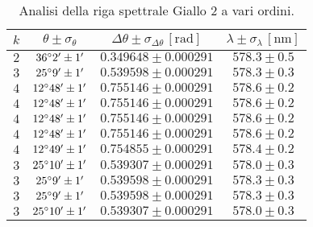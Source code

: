 \documentclass[]{article}
\begin{document}
    \begin{table}
        \centering
        \begin{tabular}{||c|c|c|c||}
            \hline
            $k$ & $\theta \pm \sigma_{\theta}$ & $\Delta\theta \pm \sigma_{\Delta\theta} \, \left[\text{rad}\right]$ & $\lambda \pm \sigma_{\lambda} \, \left[\text{nm}\right]$ \\\hline
            \hline
            $2$ & $36\degree  2' \pm 1'$ & $0.349648 \pm 0.000291$ & $578.3 \pm 0.5$ \\\hline
            $3$ & $25\degree  9' \pm 1'$ & $0.539598 \pm 0.000291$ & $578.3 \pm 0.3$ \\\hline
            $4$ & $12\degree 48' \pm 1'$ & $0.755146 \pm 0.000291$ & $578.6 \pm 0.2$ \\\hline
            $4$ & $12\degree 48' \pm 1'$ & $0.755146 \pm 0.000291$ & $578.6 \pm 0.2$ \\\hline
            $4$ & $12\degree 48' \pm 1'$ & $0.755146 \pm 0.000291$ & $578.6 \pm 0.2$ \\\hline
            $4$ & $12\degree 48' \pm 1'$ & $0.755146 \pm 0.000291$ & $578.6 \pm 0.2$ \\\hline
            $4$ & $12\degree 49' \pm 1'$ & $0.754855 \pm 0.000291$ & $578.4 \pm 0.2$ \\\hline
            $3$ & $25\degree 10' \pm 1'$ & $0.539307 \pm 0.000291$ & $578.0 \pm 0.3$ \\\hline
            $3$ & $25\degree  9' \pm 1'$ & $0.539598 \pm 0.000291$ & $578.3 \pm 0.3$ \\\hline
            $3$ & $25\degree  9' \pm 1'$ & $0.539598 \pm 0.000291$ & $578.3 \pm 0.3$ \\\hline
            $3$ & $25\degree 10' \pm 1'$ & $0.539307 \pm 0.000291$ & $578.0 \pm 0.3$ \\\hline
        \end{tabular}
        \label{giallo-2}
        \caption{Analisi della riga spettrale Giallo 2 a vari ordini.}
    \end{table}
\end{document}
